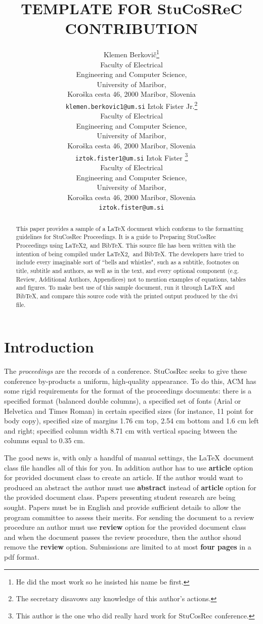\documentclass[article]{stucosrec}
\title{\latex TEMPLATE FOR StuCoSReC CONTRIBUTION}
\author{
	Klemen Berkovi\v{c}\thanks{He did the most work so he insisted his name be first.} \\
	Faculty of Electrical \\Engineering and Computer Science,\\
	University of Maribor,\\
	Koro\v{s}ka cesta 46, 2000 Maribor, Slovenia \\
	\texttt{klemen.berkovic1@um.si}
	\And
	Iztok Fister Jr.\thanks{The secretary disavows any knowledge of this author's actions.} \\
	Faculty of Electrical \\Engineering and Computer Science,\\
	University of Maribor,\\
	Koro\v{s}ka cesta 46, 2000 Maribor, Slovenia \\
	\texttt{iztok.fister1@um.si}
	\AND
	Iztok Fister \thanks{This author is the one who did really hard work for StuCosRec conference.} \\
	Faculty of Electrical \\Engineering and Computer Science,\\
	University of Maribor,\\
	Koro\v{s}ka cesta 46, 2000 Maribor, Slovenia \\
	\texttt{iztok.fister@um.si}
}
\newcommand{\latex}{\LaTeX\xspace}
\begin{document}
	
	\maketitle
	
	\begin{abstract}
		This paper provides a sample of a \latex document which conforms to the formatting guidelines for StuCosRec Proceedings.
		It is a guide to Preparing StuCosRec Proceedings using \LaTeX$2_\epsilon$ and Bib\TeX.
		This source file has been written with the intention of being compiled under \LaTeX$2_\epsilon$\ and BibTeX.
		The developers have tried to include every imaginable sort of ``bells and whistles", such as a subtitle, footnotes on title, subtitle and authors, as well as in the text, and every optional component (e.g. Review, Additional Authors, Appendices) not to mention examples of equations, tables and figures.
		To make best use of this sample document, run it through \LaTeX\ and Bib\TeX, and compare this source code with the printed output produced by the dvi file.
	\end{abstract}

			
	\section{Introduction}
	
	The \textit{proceedings} are the records of a conference.
	StuCosRec seeks to give these conference by-products a uniform, high-quality appearance.
	To do this, ACM has some rigid requirements for the format of the proceedings documents: there is a specified format (balanced  double columns), a specified set of fonts (Arial or Helvetica and Times Roman) in certain specified sizes (for instance, 11 point for body copy), specified size of margins 1.76 cm top, 2.54 cm bottom and 1.6 cm left and right; specified column width 8.71 cm with vertical spacing btween the columns equal to 0.35 cm.
	
	The good news is, with only a handful of manual settings, the \LaTeX\ document class file handles all of this for you.
	In addition author has to use \textbf{article} option for provided document class to create an article.
	If the author would want to produced an abstract the author must use \textbf{abstract} instead of \textbf{article} option for the provided document class.
	Papers presenting student research are being sought.
	Papers must be in English and provide sufficient details to allow the program committee to assess their merits.
	For sending the document to a review procedure an author must use \textbf{review} option for the provided document class and when the document passes the review procedure, then the author shoud remove the \textbf{review} option.
	Submissions are limited to at most \textbf{four pages} in a pdf format.
	
\end{document}
